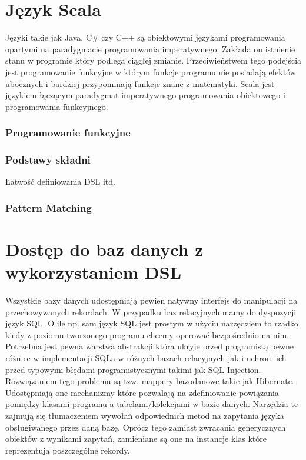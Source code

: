 \documentclass[brudnopis]{xmgr}
\begin{document}
\chapter{Język Scala}

Języki takie jak Java, C\# czy C++ są obiektowymi językami programowania opartymi na paradygmacie programowania imperatywnego. Zakłada on istnienie stanu w programie który podlega ciągłej zmianie. Przeciwieństwem tego podejścia jest programowanie funkcyjne w którym funkcje programu nie posiadają efektów ubocznych i bardziej przypominają funkcje znane z matematyki. Scala jest językiem łączącym paradygmat imperatywnego programowania obiektowego i programowania funkcyjnego.

\subsection{Programowanie funkcyjne}

\subsection{Podstawy składni}
Łatwość definiowania DSL itd.

\subsection{Pattern Matching}

\chapter{Dostęp do baz danych z wykorzystaniem DSL}

Wszystkie bazy danych udostępniają pewien natywny interfejs do manipulacji na przechowywanych rekordach. W przypadku baz relacyjnych mamy do dyspozycji język SQL. O ile np. sam język SQL jest prostym w użyciu narzędziem to rzadko kiedy z poziomu tworzonego programu chcemy operować bezpośrednio na nim. Potrzebna jest pewna warstwa abstrakcji która ukryje przed programistą pewne różnice w implementacji SQLa w różnych bazach relacyjnych jak i uchroni ich przed typowymi błędami programistycznymi takimi jak SQL Injection. Rozwiązaniem tego problemu są tzw. mappery bazodanowe takie jak Hibernate. Udostępniają one mechanizmy które pozwalają na zdefiniowanie powiązania pomiędzy klasami programu a tabelami/kolekcjami w bazie danych. Narzędzia te zajmują się tłumaczeniem wywołań odpowiednich metod na zapytania języka obsługiwanego przez daną bazę. Oprócz tego zamiast zwracania generycznych obiektów z wynikami zapytań, zamieniane są one na instancje klas które reprezentują poszczególne rekordy.
\end{document}
